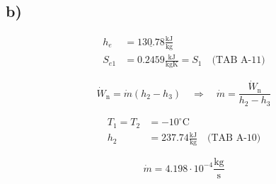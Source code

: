 

\subsection*{b)}
\begin{align*}
    h_{e} &= \underline{130.78} \frac{\text{kJ}}{\text{kg}} \\
    S_{e1} &= 0.2459 \frac{\text{kJ}}{\text{kgK}} = S_{1} \quad \text{(TAB A-11)}
\end{align*}

\[
    \dot{W}_{\text{n}} = \dot{m} (h_{2} - h_{3}) \quad \Rightarrow \quad \dot{m} = \frac{\dot{W}_{\text{n}}}{h_{2} - h_{3}}
\]

\begin{align*}
    T_{1} = T_{2} &= -10^\circ \text{C} \\
    h_{2} &= 237.74 \frac{\text{kJ}}{\text{kg}} \quad \text{(TAB A-10)}
\end{align*}

\[
    \dot{m} = 4.198 \cdot 10^{-4} \frac{\text{kg}}{\text{s}}
\]